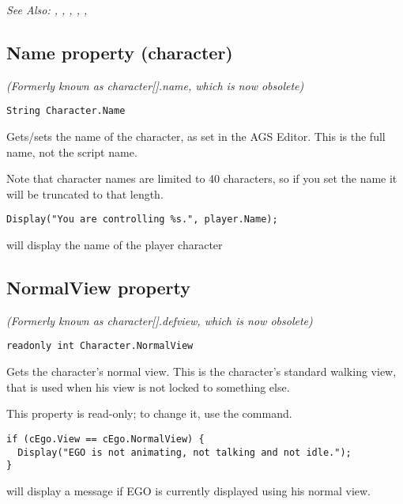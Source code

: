 \it{See Also:} ,
,
,
,
,


\subsection{Name property (character)}\label{Character.Name}%

\it{(Formerly known as character[].name, which is now obsolete)}

\begin{verbatim}
String Character.Name
\end{verbatim}
Gets/sets the name of the character, as set in the AGS Editor. This is the full name,
not the script name.

Note that character names are limited to 40 characters, so if you set the name it
will be truncated to that length.

\begin{verbatim}
Display("You are controlling %s.", player.Name);
\end{verbatim}
will display the name of the player character


\subsection{NormalView property}\label{Character.NormalView}%

\it{(Formerly known as character[].defview, which is now obsolete)}

\begin{verbatim}
readonly int Character.NormalView
\end{verbatim}
Gets the character's normal view. This is the character's standard walking view, that
is used when his view is not locked to something else.

This property is read-only; to change it, use the  command.

\begin{verbatim}
if (cEgo.View == cEgo.NormalView) {
  Display("EGO is not animating, not talking and not idle.");
}
\end{verbatim}
will display a message if EGO is currently displayed using his normal view.

